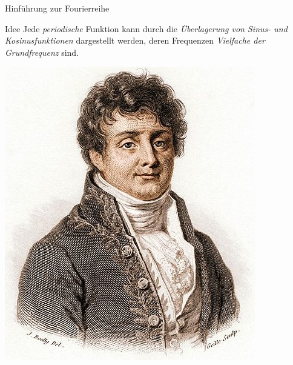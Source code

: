 \documentclass[12pt]{beamer}
\begin{document}
\begin{frame}{Hinführung zur Fourierreihe}
\begin{minipage}{0.79\linewidth}
	\begin{block}{Idee}
		Jede \textit{periodische} Funktion kann durch die \textit{Überlagerung von Sinus- und Kosinusfunktionen} dargestellt werden, deren Frequenzen \textit{Vielfache der Grundfrequenz} sind.
	\end{block}
\end{minipage}
\begin{minipage}{0.19\linewidth}
	\includegraphics[width=\linewidth]{fourier.jpg}
\end{minipage}

\vspace*{.5cm}

\end{frame}
\end{document}
